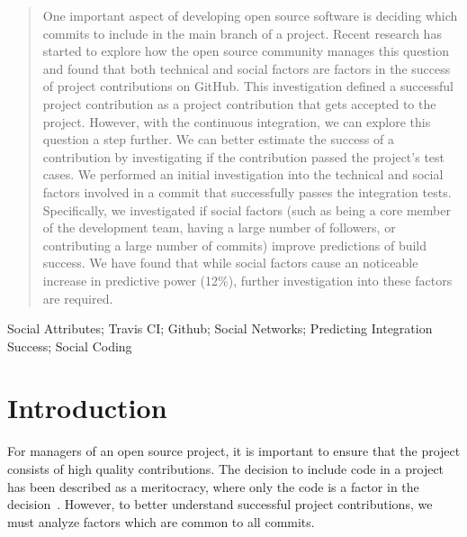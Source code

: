 \documentclass[10pt, conference]{IEEEtran}
\begin{document}




\maketitle


\begin{abstract}
One important aspect of developing open source software is deciding which
commits to include in the main branch of a project.  
Recent research has started to explore how the open source community manages
this question and found that both technical and social factors are factors in 
the success of project contributions on GitHub.  
This investigation defined a successful project contribution as a project
contribution that gets
accepted to the project.  However, with the continuous integration, we can
explore this question a step further.  We can better estimate the success of a
contribution by investigating if the contribution passed the project's
test cases.  We performed an initial investigation into the technical and
social factors involved in a commit that successfully passes the integration
tests. Specifically, we investigated if social factors (such as being a
core member of the development team, having a large number of followers,
or contributing a large number of commits) improve predictions of build
success.  We have found that while social factors cause an noticeable increase
in predictive power (12\%), further investigation into these factors are
required.
\end{abstract}

\begin{IEEEkeywords}
Social Attributes; Travis CI; Github; Social Networks; Predicting Integration 
Success; Social Coding
\end{IEEEkeywords}


%
\IEEEpeerreviewmaketitle



\section{Introduction}
For managers of an open source project, it is important to ensure that the
project consists of high quality contributions.  The decision to include code in
a project has been described as a meritocracy, where only the code is a factor
in the decision~\cite{Scacchi07}.  However, to better understand successful 
project contributions, we must analyze factors which are common to all commits.  
  
\end{document}
